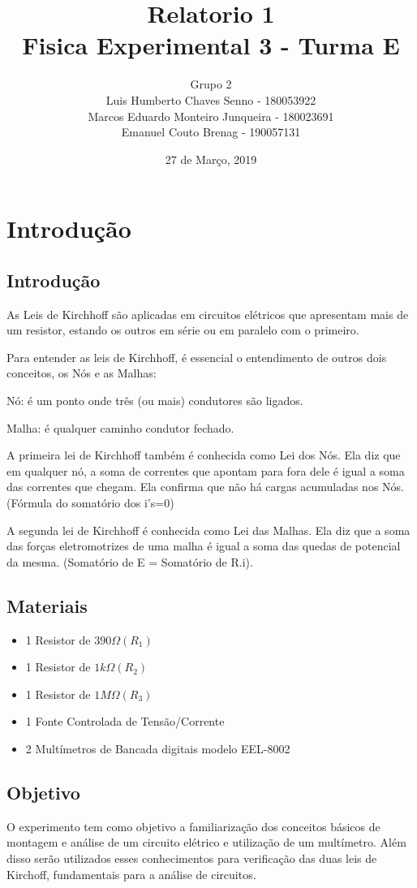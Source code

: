 \documentclass[article]{abntex2}
\title{Relatorio 1\\Fisica Experimental 3 - Turma E}
\author{Grupo 2
    \\Luis Humberto Chaves Senno - 180053922
    \\Marcos Eduardo Monteiro Junqueira - 180023691
    \\Emanuel Couto Brenag - 190057131}
\date{27 de Março, 2019}
\begin{document}
            
\maketitle   
\newpage 
\section{Introdução}   
\subsection{Introdução}
As Leis de Kirchhoff são aplicadas em circuitos elétricos 
que apresentam mais de um resistor, estando os outros 
em série ou em paralelo com o primeiro. 

Para entender as leis de Kirchhoff, é essencial
 o entendimento de outros dois conceitos, os Nós e as Malhas:

Nó: é um ponto onde três (ou mais) condutores são ligados.

Malha: é qualquer caminho condutor fechado.

A primeira lei de Kirchhoff também é conhecida como Lei dos Nós. Ela diz que em qualquer nó, a soma de correntes que apontam para fora dele é igual a soma das correntes que chegam. Ela confirma que não há cargas acumuladas nos Nós. 
(Fórmula do somatório dos i’s=0)

A segunda lei de Kirchhoff é conhecida como Lei das Malhas. Ela diz que a soma das forças eletromotrizes de uma malha é igual a soma das quedas de potencial da mesma.
(Somatório de E = Somatório de R.i).
\subsection{Materiais}
\begin{itemize}
    \item 1 Resistor de $390\Omega(R_1)$
    \item 1 Resistor de $1k\Omega(R_2)$
    \item 1 Resistor de $1M\Omega(R_3)$
    \item 1 Fonte Controlada de Tensão/Corrente
    \item 2 Multímetros de Bancada digitais modelo EEL-8002
\end{itemize}
\subsection{Objetivo}
O experimento tem como objetivo a familiarização
 dos conceitos básicos de montagem e análise de um
  circuito elétrico e utilização de um multímetro. 
  Além disso serão utilizados esses conhecimentos
   para verificação das duas leis de Kirchoff,
    fundamentais para a análise de circuitos.
\end{document}
